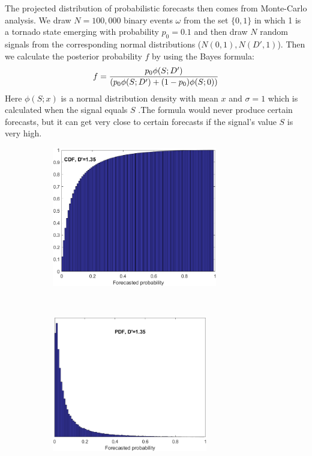 \documentclass{ametsocV6.1}
\begin{document}
The projected distribution of probabilistic forecasts then comes from Monte-Carlo analysis. We draw $N=100,000$ binary events $\omega$ from the set $\{0,1\}$ in which 1 is a tornado state emerging with probability $p_0=0.1$ and then draw $N$ random signals from the corresponding normal distributions ($N(0,1),N(D',1)$). Then we calculate the posterior probability $f$ by using the Bayes formula:
 $$f={p_0\phi(S;D')\over (p_0\phi(S;D')+(1-p_0)\phi(S;0))}$$
Here  $\phi(S;x)$ is a normal distribution density with mean $x$ and $\sigma=1$ which is calculated when the signal equals $S$ .The formula would never produce certain forecasts, but it can get very close to certain forecasts if the signal's value $S$ is very high.
 
\begin{figure}[!htbp]
\centering
\begin{subfigure}{0.45\linewidth}
\includegraphics[width=17pc]{../Graphs/cdf_forecast0.png}
\end{subfigure}
~
\begin{subfigure}{0.45\linewidth}
\includegraphics[width=16pc]{../Graphs/pdf_forecast0.png}

\end{subfigure}
\end{figure}
\end{document}
